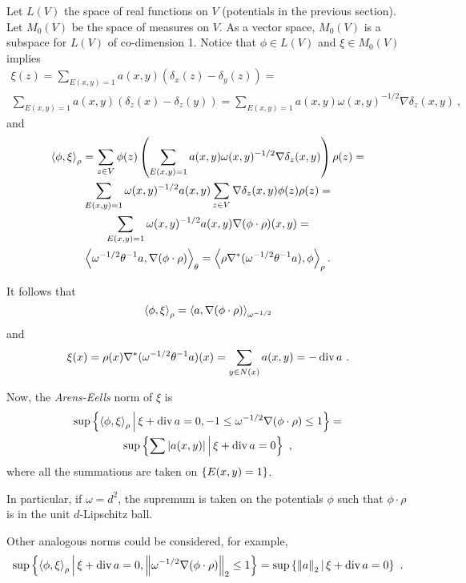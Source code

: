 \documentclass[12pt,a4paper]{amsart}
\begin{document}
Let $L(V)$ the space of real functions on $V$ (potentials in the
previous section). Let $M_0(V)$ be the space of measures on $V$. As a
vector space, $M_0(V)$ is a subspace for $L(V)$ of co-dimension
1. Notice that $\phi \in L(V)$ and $\xi \in M_0(V)$ implies
\begin{multline*}
  \xi(z) =
\sum_{E(x,y)=1} a(x,y) (\delta_x(z) - \delta_y(z)) = \\
\sum_{E(x,y)=1} a(x,y) (\delta_z(x) - \delta_z(y)) = \sum_{E(x,y)=1}
a(x,y) \omega(x,y)^{-1/2} \nabla \delta_z (x,y) \ ,
\end{multline*}
and
\begin{multline*}
  \scalarat \rho \phi \xi = \sum_{z \in V} \phi(z)
  \left(\sum_{E(x,y)=1}
    a(x,y) \omega(x,y)^{-1/2} \nabla \delta_z (x,y)\right) \rho(z) = \\
  \sum_{E(x,y)=1} \omega(x,y) ^{-1/2} a(x,y) \sum_{z \in V} \nabla \delta_z
  (x,y) \phi(z) \rho(z) = \\ \sum_{E(x,y)=1} \omega(x,y) ^{-1/2} a(x,y)
  \nabla (\phi \cdot \rho) (x,y) = \\ \scalarat \theta
  {\omega^{-1/2}\theta^{-1} a} {\nabla (\phi\cdot\rho)} =
  \scalarat \rho {\rho \nabla^* (\omega^{-1/2} \theta^{-1} a)} {\phi} .
\end{multline*}

It follows that
\begin{equation*}
  \scalarat \rho \phi \xi = \scalarat {\omega^{-1/2}} {a} {\nabla (\phi\cdot\rho)}
\end{equation*}
and
\begin{equation*}
  \xi(x) = \rho(x) \nabla^* (\omega^{-1/2} \theta^{-1} a) (x) = \sum_{y
    \in N(x)}  a(x,y) = - \Div a \ . 
\end{equation*}

Now, the \emph{Arens-Eells} norm of $\xi$ is
\begin{multline*}
  \sup\setof{\scalarat \rho \phi \xi}{\xi + \Div a = 0,
  -1 \leq \omega^{-1/2} \nabla(\phi\cdot\rho) \leq 1} = \\ \sup\setof{\sum
  \avalof{a(x,y)}}{\xi + \Div a = 0} \ ,
\end{multline*}
where all the summations are taken on $\set{E(x,y)=1}$.

In particular, if $\omega = d^2$, the supremum is taken on the
potentials $\phi$ such that $\phi\cdot\rho$ is in the unit
$d$-Lipschitz ball.

Other analogous norms could be considered, for example,
\begin{equation*}
  \sup\setof{\scalarat \rho \phi \xi}{\xi + \Div a = 0,
  \normof{\omega^{-1/2} \nabla(\phi\cdot\rho)}_2 \leq 1} = 
\sup\setof{\normof a _2}{\xi + \Div a = 0} \ .
\end{equation*}
\end{document}
